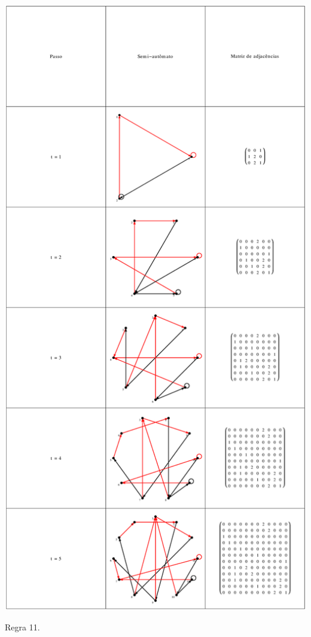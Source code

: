 \documentclass[12pt,a4paper]{article}
\begin{document}
\begin{table}[H]
\begin{center}
\includegraphics[scale=0.32]{img/mat/matr11.eps}
\caption{Regra 11.}
\label{tab:mr11}
\end{center}
\end{table}
\end{document}
